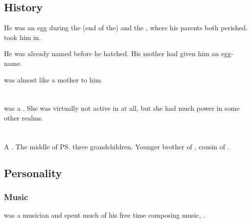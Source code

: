 \subsection{History}
He was an egg during the (end of the) \Secondbanewar{} and the \SecondShrouding{}, where his parents both perished. 
\Ishnaruchaefir{} took him in. 

He was already named before he hatched. 
His mother had given him an egg-name. 

\Criseis{} was almost like a mother to him. 















\section{\Skelcurmaggra}
\index{\Skelcurmaggra}
\Skelcurmaggra was a \dragon. 
She was virtually not active in \Azmith at all, but she had much power in some other realms. 

















\section{\Tentocoth}
\index{\Tentocoth}
A \dragon. 
The middle of \ps{\QuessanthIshnaruchaefir} three grandchildren. 
Younger brother of \Thiencaste, cousin of \Rathyon. 









\subsection{Personality}
\subsubsection{Music}
\Tentocoth{} was a musician and spent much of his free time composing music, . 
















